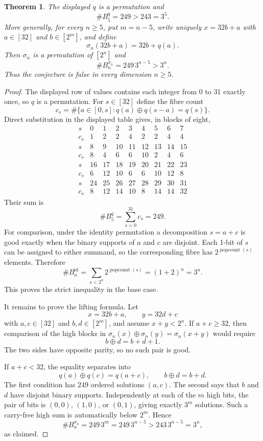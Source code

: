 \documentclass[11pt]{article}
\newtheorem{theorem}{Theorem}
\newcommand{\xor}{\mathbin{\oplus}}
\begin{document}
\begin{theorem}\label{thm:main}
The displayed $q$ is a permutation and
\[
 \#B_5^q=249>243=3^5.
\]
More generally, for every $n\geq5$, put $m=n-5$, write uniquely
$x=32b+a$ with $a\in[32]$ and $b\in[2^m]$, and define
\begin{equation}\label{eq:lift}
 \sigma_n(32b+a)=32b+q(a).
\end{equation}
Then $\sigma_n$ is a permutation of $[2^n]$ and
\[
 \#B_n^{\sigma_n}=249\,3^{n-5}>3^n.
\]
Thus the conjecture is false in every dimension $n\geq5$.
\end{theorem}

\begin{proof}
The displayed row of values contains each integer from 0 to 31 exactly once,
so $q$ is a permutation.  For $s\in[32]$ define the fibre count
\[
 c_s=\#\{a\in[0,s]:q(a)\xor q(s-a)=q(s)\}.
\]
Direct substitution in the displayed table gives, in blocks of eight,
\[
\begin{array}{c|rrrrrrrr}
s&0&1&2&3&4&5&6&7\\ \hline
c_s&1&2&2&4&2&2&4&4\\[2pt]
s&8&9&10&11&12&13&14&15\\ \hline
c_s&8&4&6&6&10&2&4&6\\[2pt]
s&16&17&18&19&20&21&22&23\\ \hline
c_s&6&12&10&6&6&10&12&8\\[2pt]
s&24&25&26&27&28&29&30&31\\ \hline
c_s&8&12&14&10&8&14&14&32
\end{array}
\]
Their sum is
\[
 \#B_5^q=\sum_{s=0}^{31}c_s=249.
\]
For comparison, under the identity permutation a decomposition $s=a+c$ is
good exactly when the binary supports of $a$ and $c$ are disjoint.  Each 1-bit
of $s$ can be assigned to either summand, so the corresponding fibre has
$2^{\operatorname{popcount}(s)}$ elements.  Therefore
\[
 \#B_n^{\mathrm{id}}
 =\sum_{s<2^n}2^{\operatorname{popcount}(s)}=(1+2)^n=3^n.
\]
This proves the strict inequality in the base case.

It remains to prove the lifting formula.  Let
\[
 x=32b+a,\qquad y=32d+c
\]
with $a,c\in[32]$ and $b,d\in[2^m]$, and assume $x+y<2^n$.  If
$a+c\geq32$, then comparison of the high blocks in
$\sigma_n(x)\xor\sigma_n(y)=\sigma_n(x+y)$ would require
\[
 b\xor d=b+d+1.
\]
The two sides have opposite parity, so no such pair is good.

If $a+c<32$, the equality separates into
\[
 q(a)\xor q(c)=q(a+c),
 \qquad
 b\xor d=b+d.
\]
The first condition has 249 ordered solutions $(a,c)$.  The second says that
$b$ and $d$ have disjoint binary supports.  Independently at each of the $m$
high bits, the pair of bits is $(0,0)$, $(1,0)$, or $(0,1)$, giving exactly
$3^m$ solutions.  Such a carry-free high sum is automatically below $2^m$.
Hence
\[
 \#B_n^{\sigma_n}=249\,3^m=249\,3^{n-5}
 >243\,3^{n-5}=3^n,
\]
as claimed.
\end{proof}
\end{document}
